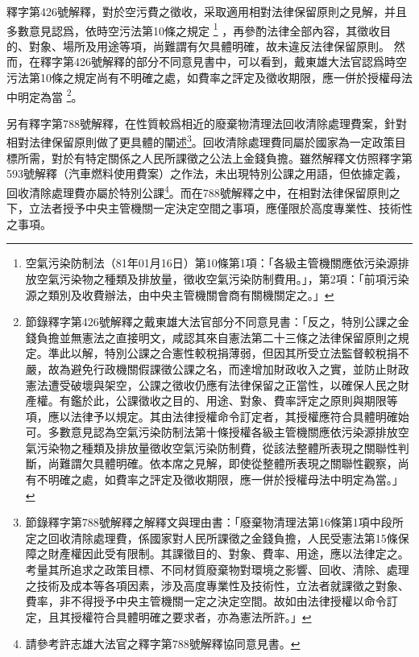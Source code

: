 \documentclass[12pt,a4paper]{article}
\begin{document}
釋字第426號解釋，對於空污費之徵收，采取適用相對法律保留原則之見解，并且多數意見認爲，依時空污法第10條之規定
\footnote{空氣污染防制法（81年01月16日）第10條第1項：「各級主管機關應依污染源排放空氣污染物之種類及排放量，徵收空氣污染防制費用。」，第2項：「前項污染源之類別及收費辦法，由中央主管機關會商有關機關定之。」}
，再參酌法律全部內容，其徵收目的、對象、場所及用途等項，尚難謂有欠具體明確，故未違反法律保留原則。
然而，在釋字第426號解釋的部分不同意見書中，可以看到，戴東雄大法官認爲時空污法第10條之規定尚有不明確之處，如費率之評定及徵收期限，應一併於授權母法中明定為當
\footnote{節錄釋字第426號解釋之戴東雄大法官部分不同意見書：「反之，特別公課之金錢負擔並無憲法之直接明文，咸認其來自憲法第二十三條之法律保留原則之規定。準此以解，特別公課之合憲性較稅捐薄弱，但因其所受立法監督較稅捐不嚴，故為避免行政機關假課徵公課之名，而達增加財政收入之實，並防止財政憲法遭受破壞與架空，公課之徵收仍應有法律保留之正當性，以確保人民之財產權。有鑑於此，公課徵收之目的、用途、對象、費率評定之原則與期限等項，應以法律予以規定。其由法律授權命令訂定者，其授權應符合具體明確始可。多數意見認為空氣污染防制法第十條授權各級主管機關應依污染源排放空氣污染物之種類及排放量徵收空氣污染防制費，從該法整體所表現之關聯性判斷，尚難謂欠具體明確。依本席之見解，即使從整體所表現之關聯性觀察，尚有不明確之處，如費率之評定及徵收期限，應一併於授權母法中明定為當。」}。



另有釋字第788號解釋，在性質較爲相近的廢棄物清理法回收清除處理費案，針對相對法律保留原則做了更具體的闡述\footnote{節錄釋字第788號解釋之解釋文與理由書：「廢棄物清理法第16條第1項中段所定之回收清除處理費，係國家對人民所課徵之金錢負擔，人民受憲法第15條保障之財產權因此受有限制。其課徵目的、對象、費率、用途，應以法律定之。考量其所追求之政策目標、不同材質廢棄物對環境之影響、回收、清除、處理之技術及成本等各項因素，涉及高度專業性及技術性，立法者就課徵之對象、費率，非不得授予中央主管機關一定之決定空間。故如由法律授權以命令訂定，且其授權符合具體明確之要求者，亦為憲法所許。」}。回收清除處理費同屬於國家為一定政策目標所需，對於有特定關係之人民所課徵之公法上金錢負擔。雖然解釋文仿照釋字第593號解釋（汽車燃料使用費案）之作法，未出現特別公課之用語，但依據定義，回收清除處理費亦屬於特別公課\footnote{請參考許志雄大法官之釋字第788號解釋協同意見書。}。而在788號解釋之中，在相對法律保留原則之下，立法者授予中央主管機關一定決定空間之事項，應僅限於高度專業性、技術性之事項。
\end{document}
